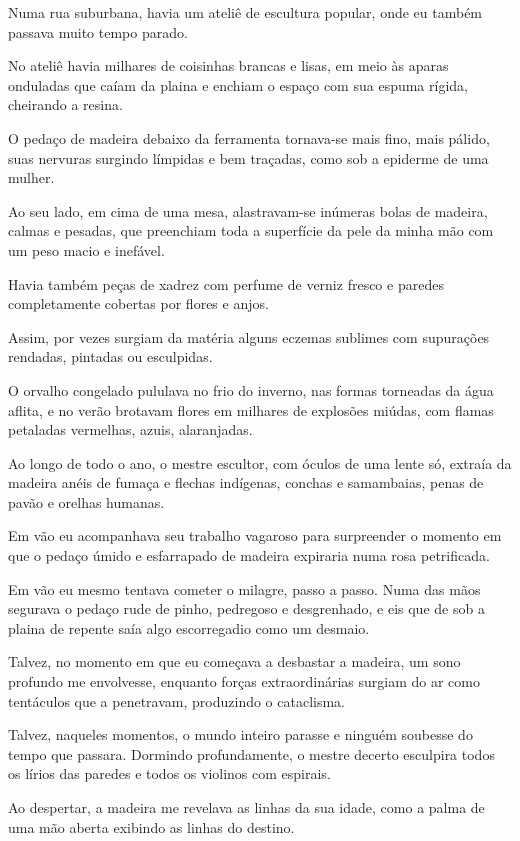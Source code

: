 Numa rua suburbana, havia um ateliê de escultura popular, onde eu também passava muito tempo parado.

No ateliê havia milhares de coisinhas brancas e lisas, em meio às aparas onduladas que caíam da plaina e enchiam o espaço com sua espuma rígida, cheirando a resina.

O pedaço de madeira debaixo da ferramenta tornava-se mais fino, mais pálido, suas nervuras surgindo límpidas e bem traçadas, como sob a epiderme de uma mulher. 

Ao seu lado, em cima de uma mesa, alastravam-se inúmeras bolas de madeira, calmas e pesadas, que preenchiam toda a superfície da pele da minha mão com um peso macio e inefável.

Havia também peças de xadrez com perfume de verniz fresco e paredes completamente cobertas por flores e anjos.

Assim, por vezes surgiam da matéria alguns eczemas sublimes com supurações rendadas, pintadas ou esculpidas.

O orvalho congelado pululava no frio do inverno, nas formas torneadas da água aflita, e no verão brotavam flores em milhares de explosões miúdas, com flamas petaladas vermelhas, azuis, alaranjadas. 

Ao longo de todo o ano, o mestre escultor, com óculos de uma lente só, extraía da madeira anéis de fumaça e flechas indígenas, conchas e samambaias, penas de pavão e orelhas humanas.

Em vão eu acompanhava seu trabalho vagaroso para surpreender o momento em que o pedaço úmido e esfarrapado de madeira expiraria numa rosa petrificada.

Em vão eu mesmo tentava cometer o milagre, passo a passo. Numa das mãos segurava o pedaço rude de pinho, pedregoso e desgrenhado, e eis que de sob a plaina de repente saía algo escorregadio como um desmaio.

Talvez, no momento em que eu começava a desbastar a madeira, um sono profundo me envolvesse, enquanto forças extraordinárias surgiam do ar como tentáculos que a penetravam, produzindo o cataclisma.

Talvez, naqueles momentos, o mundo inteiro parasse e ninguém soubesse do tempo que passara. Dormindo profundamente, o mestre decerto esculpira todos os lírios das paredes e todos os violinos com espirais.

Ao despertar, a madeira me revelava as linhas da sua idade, como a palma de uma mão aberta exibindo as linhas do destino.

